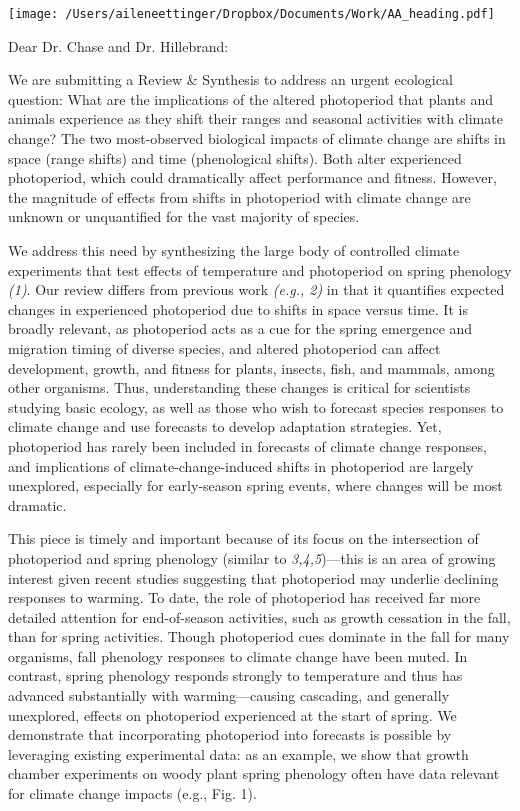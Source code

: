 \documentclass[11pt,a4paper]{letter}
\begin{document}
\begin{letter}{}
\texttt{[image: /Users/aileneettinger/Dropbox/Documents/Work/AA\_heading.pdf]}

\opening{Dear Dr. Chase and Dr. Hillebrand:}
We are submitting a Review \& Synthesis to address an urgent ecological question: What are the implications of the altered photoperiod that plants and animals experience as they shift their ranges and seasonal activities with climate change? The two most-observed biological impacts of climate change are shifts in space (range shifts) and time (phenological shifts). Both alter experienced photoperiod, which could dramatically affect performance and fitness. However, the magnitude of effects from shifts in photoperiod with climate change are unknown or unquantified for the vast majority of species.  
\par We address this need by synthesizing the large body of controlled climate experiments that test effects of temperature and photoperiod on spring phenology \emph{(1)}. Our review differs from previous work \emph{(e.g., 2)} in that it quantifies expected changes in experienced photoperiod due to shifts in space versus time. It is broadly relevant, as photoperiod acts as a cue for the spring emergence and migration timing of diverse species, and altered photoperiod can affect development, growth, and fitness for plants, insects, fish, and mammals, among other organisms. Thus, understanding these changes is critical for scientists studying basic ecology, as well as those who wish to forecast species responses to climate change and use forecasts to develop adaptation strategies. Yet, photoperiod has rarely been included in forecasts of climate change responses, and implications of climate-change-induced shifts in photoperiod are largely unexplored, especially for early-season spring events, where changes will be most dramatic. 
\par This piece is timely and important because of its focus on the intersection of photoperiod and spring phenology (similar to \emph{3,4,5})---this is an area of growing interest given recent studies suggesting that photoperiod may underlie declining responses to warming. To date, the role of photoperiod has received far more detailed attention for end-of-season activities, such as growth cessation in the fall, than for spring activities. Though photoperiod cues dominate in the fall for many organisms, fall phenology responses to climate change have been muted. In contrast, spring phenology responds strongly to temperature and thus has advanced substantially with warming---causing cascading, and generally unexplored, effects on photoperiod experienced at the start of spring. We demonstrate that incorporating photoperiod into forecasts is possible by leveraging existing experimental data: as an example, we show that growth chamber experiments on woody plant spring phenology often have data relevant for climate change impacts (e.g., Fig. 1). 


\end{letter}
\end{document}
